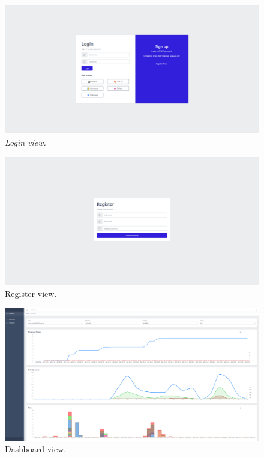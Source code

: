 \begin{figure}[ht]
    \centering
    \includegraphics[width=1\textwidth]{figures/views/login}
    \caption{\textit{Login view.}}
    \label{fig:login}
\end{figure}

\begin{figure}[ht]
    \centering
    \includegraphics[width=1\textwidth]{figures/views/register}
    \caption{Register view.}
    \label{fig:register}
\end{figure}

\begin{figure}[ht]
    \centering
    \includegraphics[width=1\textwidth]{figures/views/dashboard}
    \caption{Dashboard view.}
    \label{fig:dashboard}
\end{figure}

